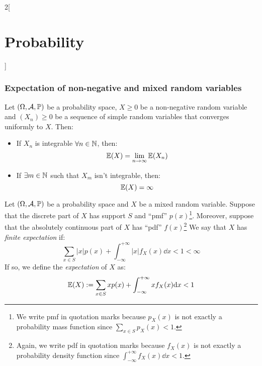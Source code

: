 \documentclass[../../../main.tex]{subfiles}
\begin{document}
\begin{multicols}{2}[\section{Probability}]
  \subsubsection{Expectation of non-negative and mixed random variables}
  \begin{prop}
    Let $(\Omega,\mathcal{A},\mathbb{P})$ be a probability space, $X\geq 0$ be a non-negative random variable and $(X_n)\geq 0$ be a sequence of simple random variables that converges uniformly to $X$. Then:
    \begin{itemize}
      \item If $X_n$ is integrable $\forall n\in\mathbb{N}$, then: $$\mathbb{E}(X)=\lim_{n\to\infty}\mathbb{E}(X_n)$$
      \item If $\exists m\in\mathbb{N}$ such that $X_m$ isn't integrable, then: $$\mathbb{E}(X)=\infty$$
    \end{itemize}
  \end{prop}
  \begin{definition}
    Let $(\Omega,\mathcal{A},\mathbb{P})$ be a probability space and $X$ be a mixed random variable. Suppose that the discrete part of $X$ has support $S$ and ``pmf'' $p(x)$\footnote{We write pmf in quotation marks because $p_X(x)$ is not exactly a probability mass function since $\sum_{x\in S}p_X(x)<1$.}. Moreover, suppose that the absolutely continuous part of $X$ has ``pdf'' $f(x)$\footnote{Again, we write pdf in quotation marks because $f_X(x)$ is not exactly a probability density function since $\int_{-\infty}^{+\infty}f_X(x)\dd x<1$.} We say that $X$ has \textit{finite expectation} if: $$\sum_{x\in S}|x|p(x)+\int_{-\infty}^{+\infty}|x|f_X(x)\dd x<1<\infty$$
    If so, we define the \textit{expectation} of $X$ as: $$\mathbb{E}(X):=\sum_{x\in S}xp(x)+\int_{-\infty}^{+\infty}xf_X(x)\dd x<1$$
  \end{definition}

\end{multicols}
\end{document}
